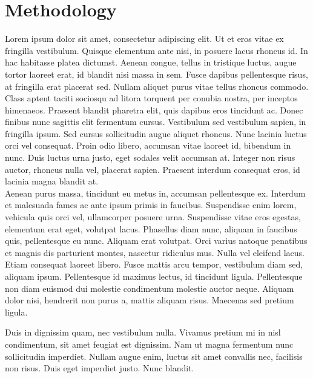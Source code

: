 \section{Methodology}

Lorem ipsum dolor sit amet, consectetur adipiscing elit. Ut et eros vitae ex fringilla vestibulum. Quisque elementum ante nisi, in posuere lacus rhoncus id. In hac habitasse platea dictumst. Aenean congue, tellus in tristique luctus, augue tortor laoreet erat, id blandit nisi massa in sem. Fusce dapibus pellentesque risus, at fringilla erat placerat sed. Nullam aliquet purus vitae tellus rhoncus commodo. Class aptent taciti sociosqu ad litora torquent per conubia nostra, per inceptos himenaeos. Praesent blandit pharetra elit, quis dapibus eros tincidunt ac. Donec finibus nunc sagittis elit fermentum cursus. Vestibulum sed vestibulum sapien, in fringilla ipsum. Sed cursus sollicitudin augue aliquet rhoncus. Nunc lacinia luctus orci vel consequat. Proin odio libero, accumsan vitae laoreet id, bibendum in nunc. Duis luctus urna justo, eget sodales velit accumsan at. Integer non risus auctor, rhoncus nulla vel, placerat sapien. Praesent interdum consequat eros, id lacinia magna blandit at. \\

Aenean purus massa, tincidunt eu metus in, accumsan pellentesque ex. Interdum et malesuada fames ac ante ipsum primis in faucibus. Suspendisse enim lorem, vehicula quis orci vel, ullamcorper posuere urna. Suspendisse vitae eros egestas, elementum erat eget, volutpat lacus. Phasellus diam nunc, aliquam in faucibus quis, pellentesque eu nunc. Aliquam erat volutpat. Orci varius natoque penatibus et magnis dis parturient montes, nascetur ridiculus mus. Nulla vel eleifend lacus. Etiam consequat laoreet libero. Fusce mattis arcu tempor, vestibulum diam sed, aliquam ipsum. Pellentesque id maximus lectus, id tincidunt ligula. Pellentesque non diam euismod dui molestie condimentum molestie auctor neque. Aliquam dolor nisi, hendrerit non purus a, mattis aliquam risus. Maecenas sed pretium ligula.

Duis in dignissim quam, nec vestibulum nulla. Vivamus pretium mi in nisl condimentum, sit amet feugiat est dignissim. Nam ut magna fermentum nunc sollicitudin imperdiet. Nullam augue enim, luctus sit amet convallis nec, facilisis non risus. Duis eget imperdiet justo. Nunc blandit.
